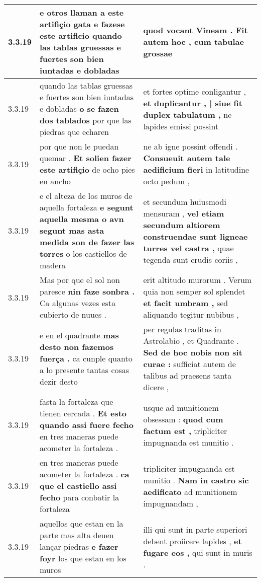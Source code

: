 \begin{tabular}{|p{1cm}|p{6.5cm}|p{6.5cm}|}
3.3.19 & e otros llaman a este artifiçio gata \textbf{ e fazese este artificio } quando las tablas gruessas e fuertes son bien iuntadas e dobladas & quod vocant Vineam . \textbf{ Fit autem hoc , } cum tabulae grossae \\\hline
3.3.19 & quando las tablas gruessas e fuertes son bien iuntadas e dobladas \textbf{ o se fazen dos tablados } por que las piedras que echaren & et fortes optime conligantur , \textbf{ et duplicantur , | siue fit duplex tabulatum , } ne lapides emissi possint \\\hline
3.3.19 & por que non le puedan quemar . \textbf{ Et solien fazer este artifiçio } de ocho pies en ancho & ne ab igne possint offendi . \textbf{ Consueuit autem tale aedificium fieri } in latitudine octo pedum , \\\hline
3.3.19 & e el alteza de los muros de aquella fortaleza \textbf{ e segunt aquella mesma o avn segunt mas asta medida son de fazer las torres } o los castiellos de madera & et secundum huiusmodi mensuram , \textbf{ vel etiam secundum altiorem construendae sunt ligneae turres vel castra , } quae tegenda sunt crudis coriis , \\\hline
3.3.19 & Mas por que el sol non paresce \textbf{ nin faze sonbra . } Ca algunas vezes esta cubierto de nuues . & erit altitudo murorum . Verum quia non semper sol splendet \textbf{ et facit umbram , } sed aliquando tegitur nubibus , \\\hline
3.3.19 & e en el quadrante \textbf{ mas desto non fazemos fuerça . } ca cunple quanto a lo presente tantas cosas dezir desto & per regulas traditas in Astrolabio , et Quadrante . \textbf{ Sed de hoc nobis non sit curae : } sufficiat autem de talibus ad praesens tanta dicere , \\\hline
3.3.19 & fasta la fortaleza que tienen cercada . \textbf{ Et esto quando assi fuere fecho } en tres maneras puede acometer la fortaleza . & usque ad munitionem obsessam : \textbf{ quod cum factum est , } tripliciter impugnanda est munitio . \\\hline
3.3.19 & en tres maneras puede acometer la fortaleza . \textbf{ ca que el castiello assi fecho } para conbatir la fortaleza & tripliciter impugnanda est munitio . \textbf{ Nam in castro sic aedificato } ad munitionem impugnandam , \\\hline
3.3.19 & aquellos que estan en la parte mas alta deuen lançar piedras \textbf{ e fazer foyr } los que estan en los muros & illi qui sunt in parte superiori debent proiicere lapides , \textbf{ et fugare eos , } qui sunt in muris . \\\hline

\end{tabular}
